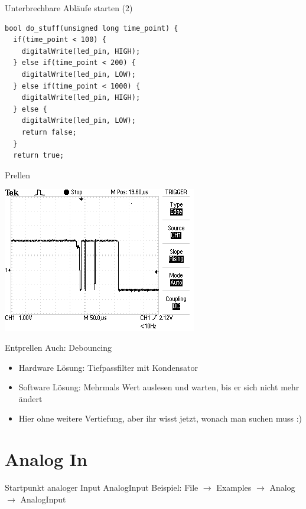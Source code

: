 \documentclass[bigger]{beamer}
\begin{document}
\begin{frame}[fragile,label={sec:org5dfbb21}]{Unterbrechbare Abläufe starten (2)}
 \begin{verbatim}
bool do_stuff(unsigned long time_point) {
  if(time_point < 100) {
    digitalWrite(led_pin, HIGH);
  } else if(time_point < 200) {
    digitalWrite(led_pin, LOW);
  } else if(time_point < 1000) {
    digitalWrite(led_pin, HIGH);
  } else {
    digitalWrite(led_pin, LOW);
    return false;
  }
  return true;
\end{verbatim}
\end{frame}

\begin{frame}[label={sec:org81930cc}]{Prellen}
\begin{center}
\includegraphics[width=.9\linewidth]{./img/bounce.png}
\end{center}
\end{frame}

\begin{frame}[label={sec:orgde02d48}]{Entprellen}
Auch: Debouncing

\begin{itemize}
\item Hardware Lösung: Tiefpassfilter mit Kondensator
\item Software Lösung: Mehrmals Wert auslesen und warten, bis er sich
nicht mehr ändert
\item Hier ohne weitere Vertiefung, aber ihr wisst jetzt, wonach man
suchen muss :)
\end{itemize}
\end{frame}

\section{Analog In}
\label{sec:org06f64ea}
\begin{frame}[label={sec:orgb1c8f9d}]{Startpunkt analoger Input}
AnalogInput Beispiel: File \(\rightarrow\) Examples \(\rightarrow\) Analog
\(\rightarrow\) AnalogInput
\end{frame}
\end{document}
